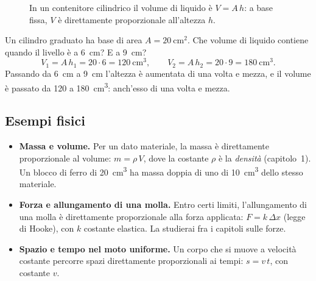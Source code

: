 \begin{figure}[!htbp]
    \centering
    \caption{In un contenitore cilindrico il volume di liquido è $V = A\,h$: a base fissa, $V$ è direttamente proporzionale all'altezza $h$.}
    \label{fig:cilindro-h}
\end{figure}

\begin{testexample}
Un cilindro graduato ha base di area $A = \SI{20}{\centi\metre\squared}$. Che volume di liquido contiene quando il livello è a \SI{6}{\centi\metre}? E a \SI{9}{\centi\metre}?
\[ V_1 = A\,h_1 = 20 \cdot 6 = \SI{120}{\centi\metre\cubed}, \qquad
   V_2 = A\,h_2 = 20 \cdot 9 = \SI{180}{\centi\metre\cubed}. \]
Passando da \SI{6}{\centi\metre} a \SI{9}{\centi\metre} l'altezza è aumentata di una volta e mezza, e il volume è passato da \SI{120}{} a \SI{180}{\centi\metre\cubed}: anch'esso di una volta e mezza.
\end{testexample}

\subsection{Esempi fisici}
\begin{itemize}
    \item \textbf{Massa e volume.} Per un dato materiale, la massa è direttamente proporzionale al volume: $m = \rho\,V$, dove la costante $\rho$ è la \emph{densità} (capitolo~1). Un blocco di ferro di \SI{20}{\centi\metre\cubed} ha massa doppia di uno di \SI{10}{\centi\metre\cubed} dello stesso materiale.
    \item \textbf{Forza e allungamento di una molla.} Entro certi limiti, l'allungamento di una molla è direttamente proporzionale alla forza applicata: $F = k\,\Delta x$ (legge di Hooke), con $k$ costante elastica. La studierai fra i capitoli sulle forze.
    \item \textbf{Spazio e tempo nel moto uniforme.} Un corpo che si muove a velocità costante percorre spazi direttamente proporzionali ai tempi: $s = v\,t$, con costante $v$.
\end{itemize}

